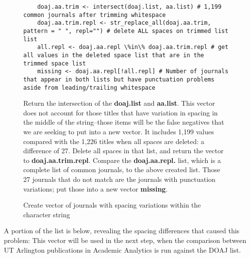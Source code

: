 \documentclass{article}
\begin{document}
\begin{figure}[htpb]
	\centering
	\begin{lstlisting}
	doaj.aa.trim <- intersect(doaj.list, aa.list) # 1,199 common journals after trimming whitespace
	doaj.aa.trim.repl <- str_replace_all(doaj.aa.trim, pattern = " ", repl="") # delete ALL spaces on trimmed list list
	all.repl <- doaj.aa.repl \%in\% doaj.aa.trim.repl # get all values in the deleted space list that are in the trimmed space list
	missing <- doaj.aa.repl[!all.repl] # Number of journals that appear in both lists but have punctuation problems aside from leading/trailing whitespace
	\end{lstlisting}
	\footnotesize{
		Return the intersection of the \textbf{doaj.list} and \textbf{aa.list}.
		This vector does not account for those titles that have variation in spacing in the middle of the string--those items will be the false negatives that we are seeking to put into  a new vector.
		It includes 1,199 values compared with the 1,226 titles when all spaces are deleted: a difference of 27.
		Delete all spaces in that list, and return the vector to \textbf{doaj.aa.trim.repl}.
		Compare the \textbf{doaj.aa.repl.} list, which is a complete list of common journals, to the above created list.
		Those 27 journals that do not match are the journals with punctuation variations; put those into a new vector \textbf{missing}.
			}
	\caption{Create vector of journals with spacing variations within the character string}
\end{figure}
A portion of the list is below, revealing the spacing differences that caused this problem:
This vector will be used in the next step, when the comparison between UT Arlington publications in Academic Analytics is run against the DOAJ list. 
\end{document}
